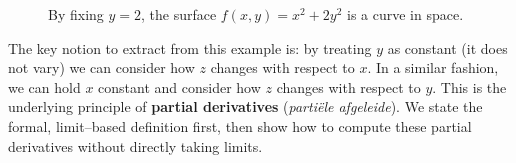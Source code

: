 \begin{figure}[h]
\centering
\qquad
{}
\caption{By fixing $y=2$, the surface $f(x,y) = x^2+2y^2$ is a curve in space.}
\end{figure}

The key notion to extract from this example is: by treating $y$ as  constant (it does not vary) we can consider how $z$ changes with respect to $x$. In a similar fashion, we can hold $x$ constant and consider how $z$ changes with respect to $y$. This is the underlying principle of \textbf{partial derivatives} (\textit{parti\"ele afgeleide}). We state the formal, limit--based definition first, then show how to compute these partial derivatives without directly taking limits.

